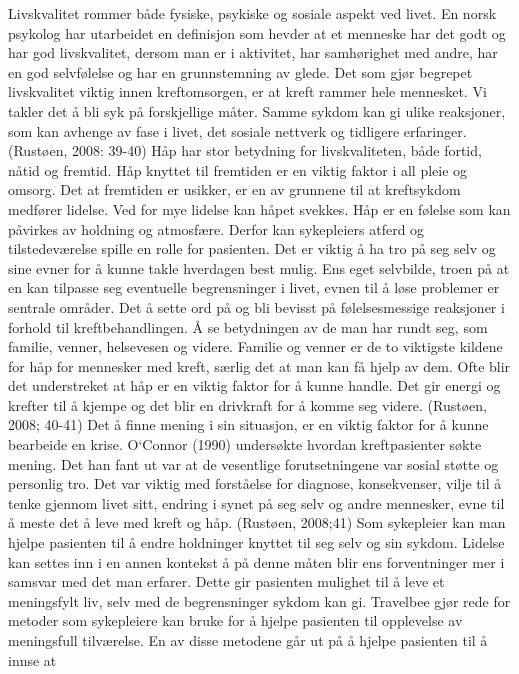 Livskvalitet rommer både fysiske, psykiske og sosiale aspekt ved livet. En
norsk psykolog har utarbeidet en definisjon som hevder at et menneske har det
godt og har god livskvalitet, dersom man er i aktivitet, har samhørighet med
andre, har en god selvfølelse og har en grunnstemning av glede. Det som gjør
begrepet livskvalitet viktig innen kreftomsorgen, er at kreft rammer hele
mennesket. Vi takler det å bli syk på forskjellige måter. Samme sykdom kan gi
ulike reaksjoner, som kan avhenge av fase i livet, det sosiale nettverk og
tidligere erfaringer. (Rustøen, 2008: 39-40) Håp har stor betydning for
livskvaliteten, både fortid, nåtid og fremtid. Håp knyttet til fremtiden er en
viktig faktor i all pleie og omsorg. Det at fremtiden er usikker, er en av
grunnene til at kreftsykdom medfører lidelse. Ved for mye lidelse kan håpet
svekkes. Håp er en følelse som kan påvirkes av holdning og atmosfære. Derfor
kan sykepleiers atferd og tilstedeværelse spille en rolle for pasienten. Det er
viktig å ha tro på seg selv og sine evner for å kunne takle hverdagen best
mulig. Ens eget selvbilde, troen på at en kan tilpasse seg eventuelle
begrensninger i livet, evnen til å løse problemer er sentrale områder. Det å
sette ord på og bli bevisst på følelsesmessige reaksjoner i forhold til
kreftbehandlingen. Å se betydningen av de man har rundt seg, som familie,
venner, helsevesen og videre. Familie og venner er de to viktigste kildene for
håp for mennesker med kreft, særlig det at man kan få hjelp av dem. Ofte blir
det understreket at håp er en viktig faktor for å kunne handle. Det gir energi
og krefter til å kjempe og det blir en drivkraft for å komme seg videre.
(Rustøen, 2008; 40-41) Det å finne mening i sin situasjon, er en viktig faktor
for å kunne bearbeide en krise. O`Connor (1990) undersøkte hvordan
kreftpasienter søkte mening. Det han fant ut var at de vesentlige
forutsetningene var sosial støtte og personlig tro. Det var viktig med
forståelse for diagnose, konsekvenser, vilje til å tenke gjennom livet sitt,
endring i synet på seg selv og andre mennesker, evne til å meste det å leve med
kreft og håp. (Rustøen, 2008;41) Som sykepleier kan man hjelpe pasienten til å
endre holdninger knyttet til seg selv og sin sykdom. Lidelse kan settes inn i
en annen kontekst å på denne måten blir ens forventninger mer i samsvar med det
man erfarer. Dette gir pasienten mulighet til å leve et meningsfylt liv, selv
med de begrensninger sykdom kan gi. Travelbee gjør rede for metoder som
sykepleiere kan bruke for å hjelpe pasienten til opplevelse av meningsfull
tilværelse. En av disse metodene går ut på å hjelpe pasienten til å innse at
